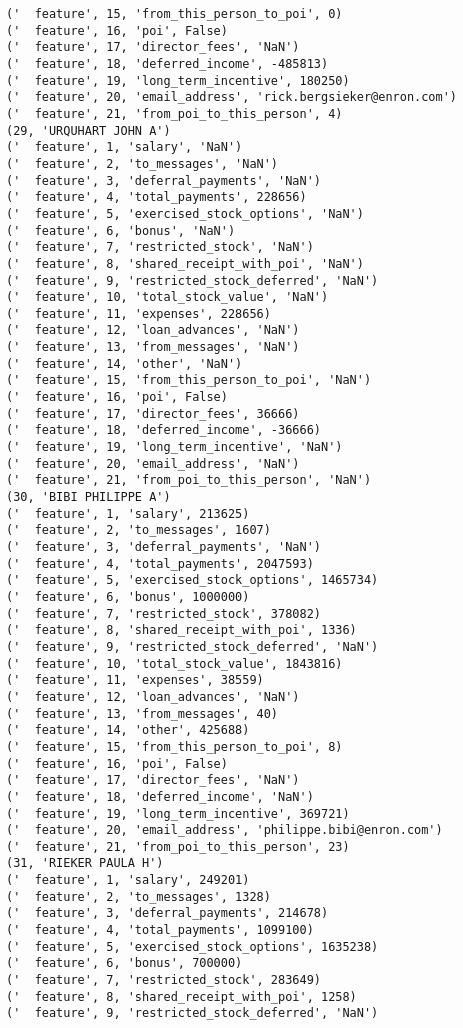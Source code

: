 \begin{verbatim}
('  feature', 15, 'from_this_person_to_poi', 0)
('  feature', 16, 'poi', False)
('  feature', 17, 'director_fees', 'NaN')
('  feature', 18, 'deferred_income', -485813)
('  feature', 19, 'long_term_incentive', 180250)
('  feature', 20, 'email_address', 'rick.bergsieker@enron.com')
('  feature', 21, 'from_poi_to_this_person', 4)
(29, 'URQUHART JOHN A')
('  feature', 1, 'salary', 'NaN')
('  feature', 2, 'to_messages', 'NaN')
('  feature', 3, 'deferral_payments', 'NaN')
('  feature', 4, 'total_payments', 228656)
('  feature', 5, 'exercised_stock_options', 'NaN')
('  feature', 6, 'bonus', 'NaN')
('  feature', 7, 'restricted_stock', 'NaN')
('  feature', 8, 'shared_receipt_with_poi', 'NaN')
('  feature', 9, 'restricted_stock_deferred', 'NaN')
('  feature', 10, 'total_stock_value', 'NaN')
('  feature', 11, 'expenses', 228656)
('  feature', 12, 'loan_advances', 'NaN')
('  feature', 13, 'from_messages', 'NaN')
('  feature', 14, 'other', 'NaN')
('  feature', 15, 'from_this_person_to_poi', 'NaN')
('  feature', 16, 'poi', False)
('  feature', 17, 'director_fees', 36666)
('  feature', 18, 'deferred_income', -36666)
('  feature', 19, 'long_term_incentive', 'NaN')
('  feature', 20, 'email_address', 'NaN')
('  feature', 21, 'from_poi_to_this_person', 'NaN')
(30, 'BIBI PHILIPPE A')
('  feature', 1, 'salary', 213625)
('  feature', 2, 'to_messages', 1607)
('  feature', 3, 'deferral_payments', 'NaN')
('  feature', 4, 'total_payments', 2047593)
('  feature', 5, 'exercised_stock_options', 1465734)
('  feature', 6, 'bonus', 1000000)
('  feature', 7, 'restricted_stock', 378082)
('  feature', 8, 'shared_receipt_with_poi', 1336)
('  feature', 9, 'restricted_stock_deferred', 'NaN')
('  feature', 10, 'total_stock_value', 1843816)
('  feature', 11, 'expenses', 38559)
('  feature', 12, 'loan_advances', 'NaN')
('  feature', 13, 'from_messages', 40)
('  feature', 14, 'other', 425688)
('  feature', 15, 'from_this_person_to_poi', 8)
('  feature', 16, 'poi', False)
('  feature', 17, 'director_fees', 'NaN')
('  feature', 18, 'deferred_income', 'NaN')
('  feature', 19, 'long_term_incentive', 369721)
('  feature', 20, 'email_address', 'philippe.bibi@enron.com')
('  feature', 21, 'from_poi_to_this_person', 23)
(31, 'RIEKER PAULA H')
('  feature', 1, 'salary', 249201)
('  feature', 2, 'to_messages', 1328)
('  feature', 3, 'deferral_payments', 214678)
('  feature', 4, 'total_payments', 1099100)
('  feature', 5, 'exercised_stock_options', 1635238)
('  feature', 6, 'bonus', 700000)
('  feature', 7, 'restricted_stock', 283649)
('  feature', 8, 'shared_receipt_with_poi', 1258)
('  feature', 9, 'restricted_stock_deferred', 'NaN')

\end{verbatim}
